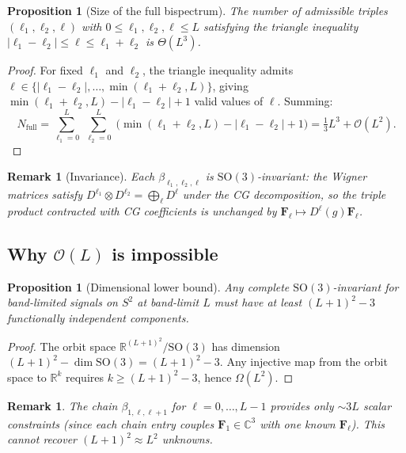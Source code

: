 \documentclass{article}
\newtheorem{proposition}[theorem]{Proposition}
\newtheorem{remark}[theorem]{Remark}
\newcommand{\R}{\mathbb{R}}
\newcommand{\C}{\mathbb{C}}
\newcommand{\SO}{\mathrm{SO}}
\begin{document}
\begin{proposition}[Size of the full bispectrum]\label{prop:app-full-size}
The number of admissible triples $(\ell_1, \ell_2, \ell)$ with
$0 \le \ell_1, \ell_2, \ell \le L$ satisfying the triangle inequality
$|\ell_1 - \ell_2| \le \ell \le \ell_1 + \ell_2$ is $\Theta(L^3)$.
\end{proposition}
\begin{proof}
For fixed $\ell_1$ and $\ell_2$, the triangle inequality admits
$\ell \in \{|\ell_1 - \ell_2|, \dotsc, \min(\ell_1 + \ell_2, L)\}$,
giving $\min(\ell_1 + \ell_2, L) - |\ell_1 - \ell_2| + 1$ valid
values of $\ell$. Summing:
\[
  N_{\mathrm{full}}
  = \sum_{\ell_1=0}^{L}\;\sum_{\ell_2=0}^{L}\;
    \bigl(\min(\ell_1+\ell_2,L) - |\ell_1-\ell_2| + 1\bigr)
  = \tfrac{1}{3}L^3 + \mathcal{O}(L^2).
\]
\end{proof}

\begin{remark}[Invariance]
Each $\beta_{\ell_1,\ell_2,\ell}$ is $\SO(3)$-invariant: the Wigner
matrices satisfy $D^{\ell_1} \otimes D^{\ell_2}
= \bigoplus_\ell D^\ell$ under the CG decomposition, so the triple
product contracted with CG coefficients is unchanged by
$\mathbf{F}_\ell \mapsto D^\ell(g)\mathbf{F}_\ell$.
\end{remark}

\subsection{Why $\mathcal{O}(L)$ is impossible}

\begin{proposition}[Dimensional lower bound]\label{prop:app-lower-bound}
Any complete $\SO(3)$-invariant for band-limited signals on $S^2$
at band-limit $L$ must have at least $(L+1)^2 - 3$ functionally
independent components.
\end{proposition}
\begin{proof}
The orbit space $\R^{(L+1)^2} / \SO(3)$ has dimension
$(L+1)^2 - \dim\SO(3) = (L+1)^2 - 3$. Any injective map from the
orbit space to $\R^k$ requires $k \ge (L+1)^2 - 3$, hence
$\Omega(L^2)$.
\end{proof}

\begin{remark}
The chain $\beta_{1,\ell,\ell+1}$ for $\ell = 0, \dotsc, L-1$ provides
only $\sim 3L$ scalar constraints (since each chain entry couples
$\mathbf{F}_1 \in \C^3$ with one known $\mathbf{F}_\ell$). This cannot
recover $(L+1)^2 \approx L^2$ unknowns.
\end{remark}
\end{document}
